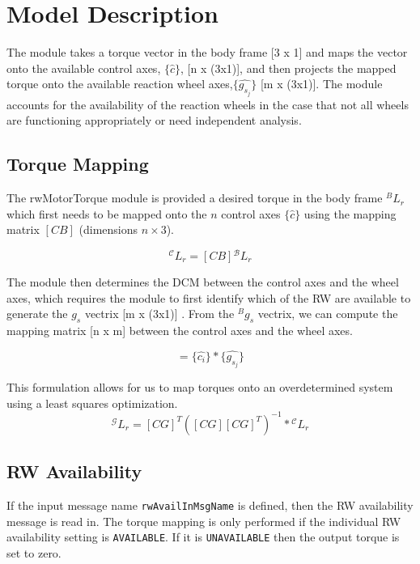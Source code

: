 \section{Model Description}
The module takes a torque vector in the body frame [3 x 1] and maps the vector onto the available control axes, $\lbrace \hat{c} \rbrace$, [n x (3x1)], and then projects the mapped torque onto the available reaction wheel axes,$\lbrace \hat{g_{s_j}} \rbrace$ [m x (3x1)]. The module accounts for the availability of the reaction wheels in the case that not all wheels are functioning appropriately or need independent analysis. 



\subsection{Torque Mapping}
The rwMotorTorque module is provided a desired torque in the body frame ${}^{B}L_r$ which first needs to be mapped onto the $n$ control axes $\lbrace \hat{c} \rbrace$ using the mapping matrix $[CB]$ (dimensions $n \times 3$). 



\begin{equation}
{}^{\mathcal{C}}L_r = [CB]{}^{\mathcal{B}}L_r
\end{equation}

The module then determines the DCM between the control axes and the wheel axes, which requires the module to first identify which of the RW are available to generate the $g_s$ vectrix [m x (3x1)] . From the ${}^{B}g_s$ vectrix, we can compute the mapping matrix [n x m] between the control axes and the wheel axes.

\begin{equation}
[CG_{ij}] = \lbrace  \hat{c_i} \rbrace*  \lbrace \hat{g_{s_j}} \rbrace
\end{equation}

This formulation allows for us to map torques onto an overdetermined system using a least squares optimization. 
\begin{equation}
 {}^{\mathcal{G}}L_r  = [CG]^T \left([CG][CG]^T\right)^{-1} * {}^{\mathcal{C}}L_r 
\end{equation}


\subsection{RW Availability} 
If the input message name {\tt rwAvailInMsgName} is defined, then the RW availability message is read in. The torque mapping is only performed if the individual RW availability setting is {\tt AVAILABLE}.  If it is {\tt UNAVAILABLE} then the output torque is set to zero.  

